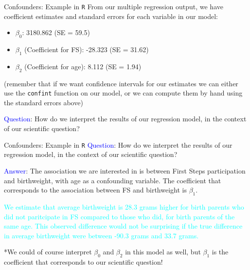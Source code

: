 \documentclass[10pt,t]{beamer}
\begin{document}
\begin{frame}{Confounders: Example in \texttt{R}}
From our multiple regression output, we have coefficient estimates and standard errors for each variable in our model:

\vspace{0.3cm}

\begin{itemize}
	\item $\beta_0$: 3180.862 (SE = 59.5)
	\item $\beta_1$ (Coefficient for FS): -28.323 (SE = 31.62)
	\item $\beta_2$ (Coefficient for age): 8.112 (SE = 1.94)
\end{itemize}

\vspace{0.3cm}
	
(remember that if we want confidence intervals for our estimates we can either use the \texttt{confint} function on our model, or we can compute them by hand using the standard errors above)

\vspace{0.3cm}

\textcolor{blue}{Question}: How do we interpret the results of our regression model, in the context of our scientific question?

	
\end{frame}

\begin{frame}{Confounders: Example in \texttt{R}}
\textcolor{blue}{Question}: How do we interpret the results of our regression model, in the context of our scientific question?

\vspace{0.3cm}

\textcolor{blue}{Answer}: The association we are interested in is between First Steps participation and birthweight, with age as a confounding variable. The coefficient that corresponds to the association between FS and birthweight is $\beta_1$.

\vspace{0.3cm}

\textcolor{cyan}{We estimate that average birthweight is 28.3 grams higher for birth parents who did not paritcipate in FS compared to those who did, for birth parents of the same age. This observed difference would not be surprising if the true difference in average birthweight were between -90.3 grams and  33.7 grams.} \pause

\vspace{0.3cm}

*We could of course interpret $\beta_0$ and $\beta_2$ in this model as well, but $\beta_1$ is the coefficient that corresponds to our scientific question!
\end{frame}
\end{document}
